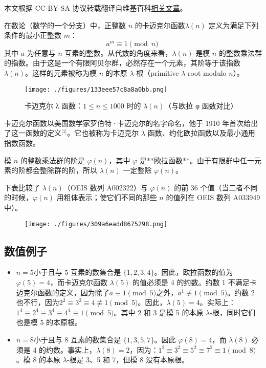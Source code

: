 
本文根据 CC-BY-SA 协议转载翻译自维基百科\href{https://en.wikipedia.org/wiki/Carmichael_function}{相关文章}。

在数论（数学的一个分支）中，正整数 $n$ 的卡迈克尔函数$\lambda(n)$ 定义为满足下列条件的最小正整数 $m$：
$$
a^{m} \equiv 1 \pmod{n}~
$$
其中 $a$ 为任意与 $n$ 互素的整数。从代数的角度来看，$\lambda(n)$ 是模 $n$ 的整数乘法群的指数。由于这是一个有限阿贝尔群，必然存在一个元素，其阶等于该指数 $\lambda(n)$。这样的元素被称为模 $n$ 的本原 $\lambda$-根（primitive $\lambda$-root modulo $n$）。
\begin{figure}[ht]
\centering
\texttt{[image: ./figures/133eee57c8a8a0bb.png]}
\caption{卡迈克尔 λ 函数：$1 \le n \le 1000$ 时的 $\lambda(n)$（与欧拉 φ 函数对比）} \label{fig_KMKRhs_1}
\end{figure}
卡迈克尔函数以美国数学家罗伯特·卡迈克尔的名字命名，他于 1910 年首次给出了这一函数的定义\(^\text{[1]}\)。它也被称为卡迈克尔 $\lambda$ 函数、约化欧拉函数以及最小通用指数函数。

模 $n$ 的整数乘法群的阶是 $\varphi(n)$，其中 $\varphi$ 是**欧拉函数**。由于有限群中任一元素的阶都会整除群的阶，所以 $\lambda(n)$ 一定整除 $\varphi(n)$。

下表比较了 $\lambda(n)$（OEIS 数列 A002322）与 $\varphi(n)$ 的前 36 个值（当二者不同的时候，$\varphi(n)$ 用粗体表示；使它们不同的那些 $n$ 的值列在 OEIS 数列 A033949 中）。
\begin{figure}[ht]
\centering
\texttt{[image: ./figures/309a6eadd8675298.png]}
\caption{} \label{fig_KMKRhs_2}
\end{figure}
\subsection{数值例子}
\begin{itemize}
\item $ n = 5$小于且与 5 互素的数集合是 $\{1, 2, 3, 4\}$。因此，欧拉函数的值为 $\varphi(5) = 4$，而卡迈克尔函数 $\lambda(5)$ 的值必须是 4 的约数。约数 1 不满足卡迈克尔函数的定义，因为除了$a \equiv 1 \pmod{5}$之外，$a^1 \not\equiv 1 \pmod{5}$。约数 2 也不行，因为$2^2 \equiv 3^2 \equiv 4 \not\equiv 1 \pmod{5}$。因此，$\lambda(5) = 4$。实际上：$1^4 \equiv 2^4 \equiv 3^4 \equiv 4^4 \equiv 1 \pmod{5}$。其中 2 和 3 是模 5 的本原 $\lambda$-根，同时它们也是模 5 的本原根。
\item $ n = 8$小于且与 8 互素的数集合是 $\{1, 3, 5, 7\}$。因此 $\varphi(8) = 4$，而 $\lambda(8)$ 必须是 4 的约数。事实上，$\lambda(8) = 2$，因为：$
1^2 \equiv 3^2 \equiv 5^2 \equiv 7^2 \equiv 1 \pmod{8}$。模 8 的本原 $\lambda$-根是 3、5 和 7，但模 8 没有本原根。
\end{itemize}
